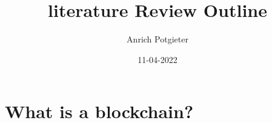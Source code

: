 \documentclass[12pt]{article}
\title{literature Review Outline}
\author{Anrich Potgieter}
\date{11-04-2022}
\begin{document}
\maketitle
\tableofcontents

\section{What is a blockchain?}
\end{document}
